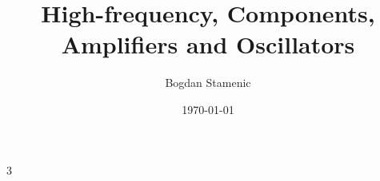 

\newcommand{\FormelsammlungTitel}{High-frequency, Components, Amplifiers and Oscillators}
\newcommand{\FormelsammlungAutor}{Bogdan Stamenic}
\setcounter{tocdepth}{2} %


	\title{\FormelsammlungTitel}
	\author{\FormelsammlungAutor}
	\date{\today}
	\begin{multicols}{3}
        \maketitle
        \tableofcontents
        
        
        
        
        
	\end{multicols}

